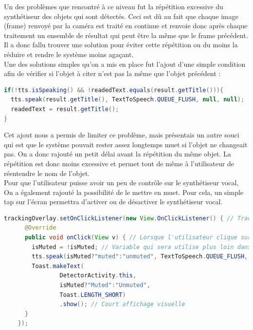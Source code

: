 \documentclass[UTF8]{EPURapport}
\begin{document}
Un des problèmes que rencontré à ce niveau fut la répétition excessive du synthétiseur des objets qui sont détectés. Ceci est dû au fait que chaque image (frame) renvoyé par la caméra est traité en continue et renvoie donc après chaque traitement un ensemble de résultat qui peut être la même que le frame précédent. Il a donc fallu trouver une solution pour éviter cette répétition ou du moins la réduire et rendre le système moins agaçant.\\

Une des solutions simples qu'on a mis en place fut l'ajout d'une simple condition afin de vérifier si l'objet à citer n'est pas la même que l'objet précédent :\\

\begin{lstlisting}[language=Java]
if(!tts.isSpeaking() && !readedText.equals(result.getTitle())){
  tts.speak(result.getTitle(), TextToSpeech.QUEUE_FLUSH, null, null);
  readedText = result.getTitle();
}
\end{lstlisting}

Cet ajout nous a permis de limiter ce problème, mais présentais un autre souci qui est que le système pouvait rester assez longtemps muet si l'objet ne changeait pas. On a donc rajouté un petit délai avant la répétition du même objet. La répétition est donc moins excessive et permet tout de même à l'utilisateur de réentendre le nom de l'objet.\\

Pour que l'utilisateur puisse avoir un peu de contrôle sur le synthétiseur vocal, On a également rajouté la possibilité de le mettre en muet. Pour cela, un simple tap sur l'écran permettra d'activer ou de désactiver le synthétiseur vocal.\\

\begin{lstlisting}[language=Java]
trackingOverlay.setOnClickListener(new View.OnClickListener() { // TrackingOverlay est la vue affiche sur l'activite principale de l'application
      @Override
      public void onClick(View v) { // Lorsque l'utilisateur clique sur l'ecran
        isMuted = !isMuted; // Variable qui sera utilise plus loin dans le code qui desactivera le synthetiseur vocal
        tts.speak(isMuted?"muted":"unmuted", TextToSpeech.QUEUE_FLUSH, null, null); // On indique que le synthetiseur va etre desactive/active
        Toast.makeText(
                DetectorActivity.this,
                isMuted?"Muted":"Unmuted",
                Toast.LENGTH_SHORT)
                .show(); // Court affichage visuelle
      }
    });
\end{lstlisting}
\end{document}
